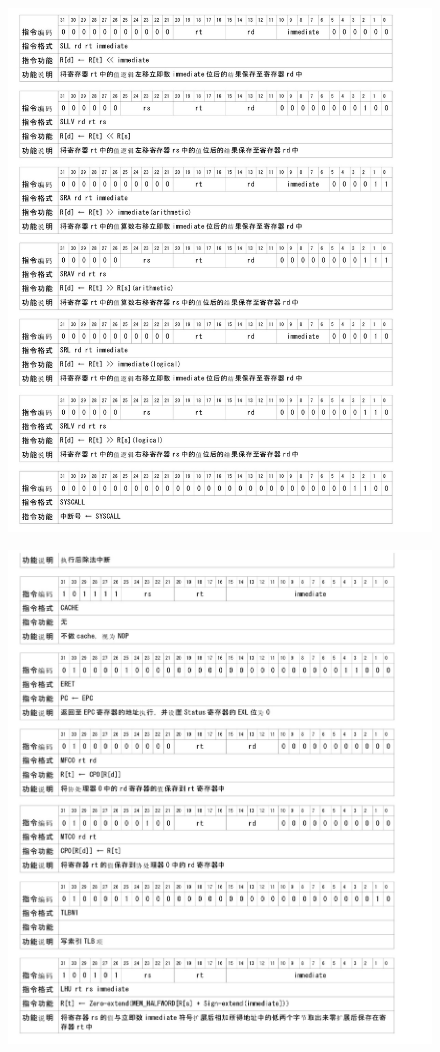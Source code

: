     \begin{figure}[!hbp]
            \centering
            \includegraphics[width=\textwidth]{chart/insert6.jpg}
    \end{figure}

    \begin{figure}[!hbp]
            \centering
            \includegraphics[width=\textwidth]{chart/insert7.jpg}
    \end{figure}